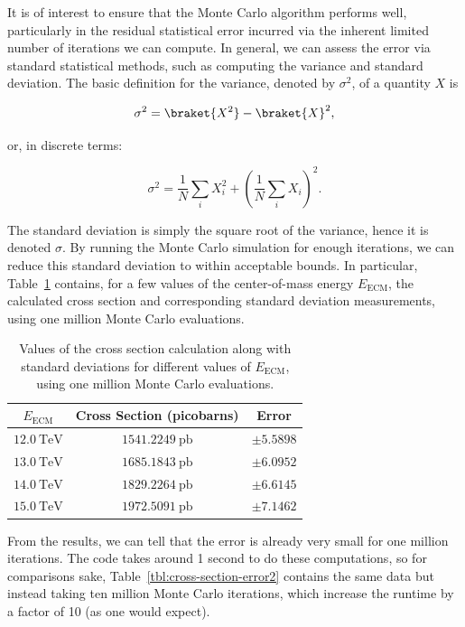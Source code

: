 It is of interest to ensure that the Monte Carlo algorithm performs well, particularly in the residual statistical error incurred via the inherent limited number of iterations we can compute. In general, we can assess the error via standard statistical methods, such as computing the variance and standard deviation. The basic definition for the variance, denoted by $\sigma^2$, of a quantity $X$ is

\begin{equation}
  \sigma^2 = \braket{X^2} - \braket{X}^2,
\end{equation}

or, in discrete terms:

\begin{equation}
  \sigma^2 = \frac{1}{N}\sum_i X_i^2 + \left( \frac{1}{N} \sum_i X_i \right)^2.
\end{equation}

The standard deviation is simply the square root of the variance, hence it is denoted $\sigma$. By running the Monte Carlo simulation for enough iterations, we can reduce this standard deviation to within acceptable bounds. In particular, Table~\ref{tbl:cross-section-error} contains, for a few values of the center-of-mass energy $E_{\mathrm{ECM}}$, the calculated cross section and corresponding standard deviation measurements, using one million Monte Carlo evaluations.

\begin{table}[h]
  \centering
  \begin{tabular}{|c|c|c|}
    \hline
    $E_{\mathrm{ECM}}$ & Cross Section (picobarns) & Error \\ \hline
    $\qty{12.0}{\tera\electronvolt}$ & $\qty{1541.2249}{\pico\barn}$ & $\pm 5.5898$ \\ \hline
    $\qty{13.0}{\tera\electronvolt}$ & $\qty{1685.1843}{\pico\barn}$ & $\pm 6.0952$ \\ \hline
    $\qty{14.0}{\tera\electronvolt}$ & $\qty{1829.2264}{\pico\barn}$ & $\pm 6.6145$ \\ \hline
    $\qty{15.0}{\tera\electronvolt}$ & $\qty{1972.5091}{\pico\barn}$ & $\pm 7.1462$ \\ \hline
  \end{tabular}
  \caption{Values of the cross section calculation along with standard deviations for different values of $E_{\mathrm{ECM}}$, using one million Monte Carlo evaluations.}
  \label{tbl:cross-section-error}
\end{table}

From the results, we can tell that the error is already very small for one million iterations. The code takes around 1 second to do these computations, so for comparisons sake, Table~\ref{tbl:cross-section-error2} contains the same data but instead taking ten million Monte Carlo iterations, which increase the runtime by a factor of 10 (as one would expect).


